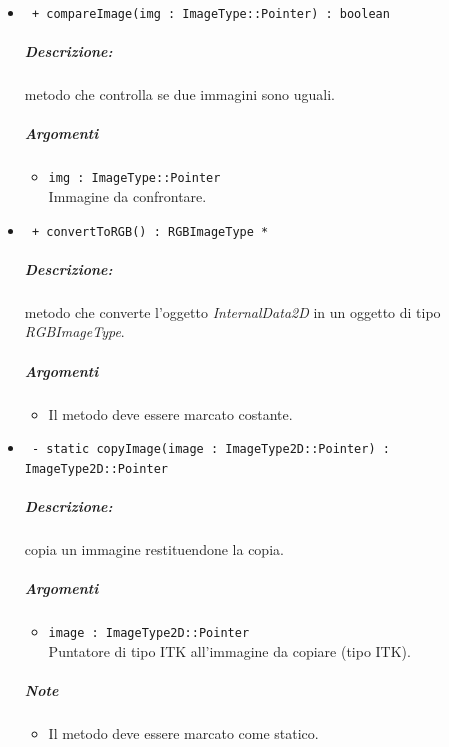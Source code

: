 \begin{itemize}
		\item \color{blue}\verb! + compareImage(img : ImageType::Pointer) : boolean!\\
		\color{black}
		\subparagraph{Descrizione:} metodo che controlla se due immagini sono uguali.
		\subparagraph{Argomenti}
			\begin{itemize}
				\item \color{RoyalPurple}\verb!img : ImageType::Pointer!\\
				\color{black}
				Immagine da confrontare.
			\end{itemize}
		
		\item \color{blue}\verb! + convertToRGB() : RGBImageType *!\\
		\color{black}
		\subparagraph{Descrizione:} metodo che converte l'oggetto \textsl{InternalData2D} in un oggetto di tipo \textsl{RGBImageType}.
		\subparagraph{Argomenti}
			\begin{itemize}
				\item Il metodo deve essere marcato costante.
			\end{itemize}
			
		\item \color{blue}\verb! - static copyImage(image : ImageType2D::Pointer) : ImageType2D::Pointer !\\
		\color{black} 
		\subparagraph{Descrizione:} copia un immagine restituendone la copia.
		\subparagraph{Argomenti}
			\begin{itemize}
				\item \color{RoyalPurple}\verb!image : ImageType2D::Pointer!\\
				\color{black}Puntatore di tipo ITK\g{} all'immagine da copiare (tipo ITK\g{}).
			\end{itemize}
		\subparagraph{Note}
			\begin{itemize}
				\item Il metodo deve essere marcato come statico.
			\end{itemize}
			
	\end{itemize}
	
\pagebreak



\color{black}
